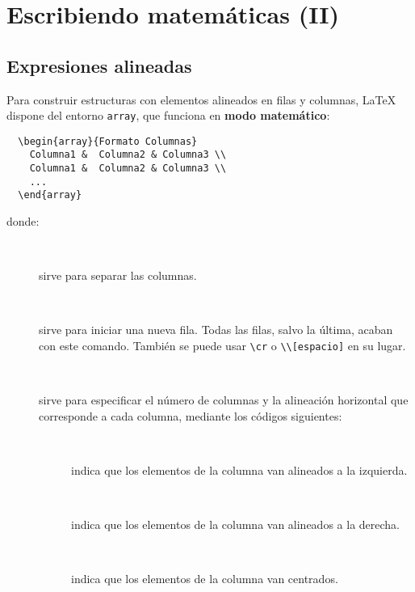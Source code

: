 \documentclass[11pt,a4paper]{report}
\begin{document}
\chapter{Escribiendo matemáticas (II)}





\section{Expresiones alineadas}




Para construir estructuras con elementos alineados en filas y columnas, \LaTeX{} dispone del entorno \texttt{array}, que funciona en \textbf{modo matemático}:

\begin{verbatim}
  \begin{array}{Formato Columnas}
    Columna1 &  Columna2 & Columna3 \\
    Columna1 &  Columna2 & Columna3 \\
    ...
  \end{array}
\end{verbatim}

donde:
\begin{description}
%
\item[\fbox{\texttt{\&}}\,\,]
sirve para separar las columnas.
%
\item[\fbox{\texttt{\textbackslash \textbackslash}}\,\,]
sirve para iniciar una nueva fila.
Todas las filas, salvo la última, acaban con este comando. 
También se puede usar {\verb=\cr=} o {\verb=\\[espacio]=} en su lugar.
%
\item[\,\,]
sirve para especificar el número de columnas y la alineación horizontal que corresponde a cada columna, mediante los códigos siguientes:
%
  \begin{description}
  \item[\,\,] indica que los elementos de la columna van alineados a la izquierda.
  \item[\,\,] indica que los elementos de la columna van alineados a la derecha.
  \item[\,\,] indica que los elementos de la columna van centrados.
  \end{description}
%
\end{description}
\end{document}
